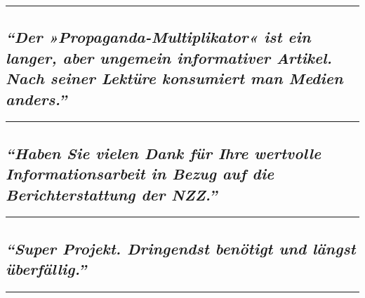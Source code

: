 \begin{center}\rule{0.5\linewidth}{\linethickness}\end{center}

\hypertarget{der-propaganda-multiplikator-ist-ein-langer-aber-ungemein-informativer-artikel-nach-seiner-lektuxfcre-konsumiert-man-medien-anders}{%
\subsection{\texorpdfstring{\emph{``Der »Propaganda-Multiplikator« ist
ein langer, aber ungemein informativer Artikel. Nach seiner Lektüre
konsumiert man Medien
anders.''}}{``Der »Propaganda-Multiplikator« ist ein langer, aber ungemein informativer Artikel. Nach seiner Lektüre konsumiert man Medien anders.''}}\label{der-propaganda-multiplikator-ist-ein-langer-aber-ungemein-informativer-artikel-nach-seiner-lektuxfcre-konsumiert-man-medien-anders}}

\begin{center}\rule{0.5\linewidth}{\linethickness}\end{center}

\hypertarget{haben-sie-vielen-dank-fuxfcr-ihre-wertvolle-informationsarbeit-in-bezug-auf-die-berichterstattung-der-nzz}{%
\subsection{\texorpdfstring{\emph{``Haben Sie vielen Dank für Ihre
wertvolle Infor­ma­tions­arbeit in Bezug auf die Berichterstattung der
NZZ.''}}{``Haben Sie vielen Dank für Ihre wertvolle Infor­ma­tions­arbeit in Bezug auf die Berichterstattung der NZZ.''}}\label{haben-sie-vielen-dank-fuxfcr-ihre-wertvolle-informationsarbeit-in-bezug-auf-die-berichterstattung-der-nzz}}

\begin{center}\rule{0.5\linewidth}{\linethickness}\end{center}

\hypertarget{super-projekt-dringendst-benuxf6tigt-und-luxe4ngst-uxfcberfuxe4llig}{%
\subsection{\texorpdfstring{\emph{``Super Projekt. Dringendst benötigt
und längst
überfällig.''}}{``Super Projekt. Dringendst benötigt und längst überfällig.''}}\label{super-projekt-dringendst-benuxf6tigt-und-luxe4ngst-uxfcberfuxe4llig}}

\begin{center}\rule{0.5\linewidth}{\linethickness}\end{center}

